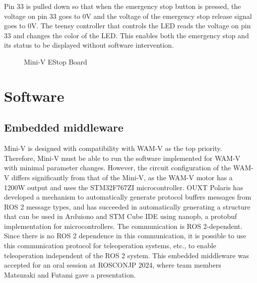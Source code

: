 \documentclass[lettersize,journal]{IEEEtran}
\begin{document}
Pin 33 is pulled down so that when the emergency stop button is pressed, the voltage on pin 33 goes to 0V and the voltage of the emergency stop release signal goes to 0V.
The teensy controller that controls the LED reads the voltage on pin 33 and changes the color of the LED.
This enables both the emergency stop and its status to be displayed without software intervention.

\begin{figure}[H]
  \begin{center}
  \end{center}
  \caption{Mini-V EStop Board}
  \label{fig:miniv_estop_board}
\end{figure}

\section{Software}

\subsection{Embedded middleware}

Mini-V is designed with compatibility with WAM-V as the top priority.
Therefore, Mini-V must be able to run the software implemented for WAM-V with minimal parameter changes.
However, the circuit configuration of the WAM-V differs significantly from that of the Mini-V, as the WAM-V motor has a 1200W output and uses the STM32F767ZI microcontroller.
OUXT Polaris has developed a mechanism to automatically generate protocol buffers messages from ROS 2 message types, and has succeeded in automatically generating a structure that can be used in Arduiono and STM Cube IDE using nanopb, a protobuf implementation for microcontrollers. The communication is ROS 2-dependent.
Since there is no ROS 2 dependence in this communication, it is possible to use this communication protocol for teleoperation systems, etc., to enable teleoperation independent of the ROS 2 system.
This embedded middleware was accepted for an oral session at ROSCONJP 2024, where team members Matsuzaki and Futami gave a presentation.
\end{document}
